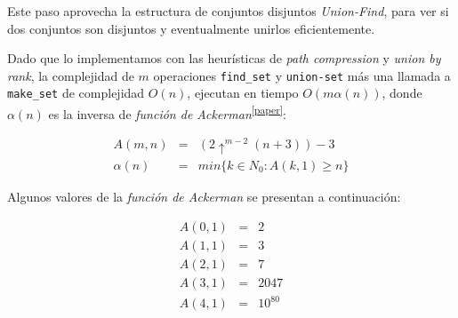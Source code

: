 

Este paso aprovecha la estructura de conjuntos disjuntos \textit{Union-Find}, para ver si dos conjuntos son disjuntos y eventualmente unirlos eficientemente. 

Dado que lo implementamos con las heur\'isticas de \textit{path compression} y \textit{union by rank}, la complejidad de $m$ operaciones \texttt{find_set} y \texttt{union-set} m\'as una llamada a \texttt{make_set} de complejidad $O(n)$, ejecutan en tiempo $O(m\alpha(n))$, donde $\alpha(n)$ es la inversa de\emph{ funci\'on de Ackerman}\textsuperscript{\ref{paper}}:

\begin{equation*}
\begin{array}{lll}
A(m,n) & = & (2\uparrow^{m-2}(n+3))-3 \\
\alpha(n) & = & min\{k \in N_0 : A(k,1) \geq n\}
\end{array}
\end{equation*}

\newpage

	Algunos valores de la \emph{funci\'on de Ackerman} se presentan a continuaci\'on:

\begin{equation*}
\begin{array}{lll}
A(0,1) & = & 2 \\
A(1,1) & = & 3 \\
A(2,1) & = & 7 \\
A(3,1) & = & 2047 \\
A(4,1) & = & 10^{80}
\end{array}
\end{equation*}

